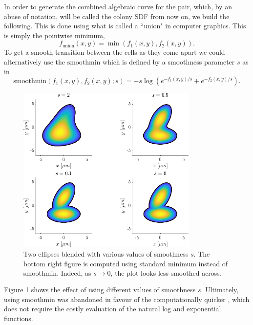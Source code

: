 In order to generate 
the combined algebraic curve for the pair, which, by an abuse of notation, will 
be called the colony SDF from now on, we build the following.
This is done using what is called a ``union" in computer graphics. 
This is simply the pointwise minimum,
\begin{equation*}
    f_{\textrm{union}}(x,y) = \min(f_1(x,y), f_2(x,y)).
\end{equation*} 
To get a smooth transition between the cells as they come apart we could alternatively use 
the $\textrm{smoothmin}$ which is defined by a smoothness parameter $s$ as in
\begin{equation*}
    \textrm{smoothmin}(f_1(x,y), f_2(x,y); s) = -s \log(e^{-f_1(x,y)/s} + e^{-f_2(x,y)/s}).
\end{equation*}
\begin{figure}[!htb]
    \centering
    \includegraphics[width=0.8\textwidth]{chapter2/figures/compareSmoothness.pdf}
    \caption{Two ellipses blended with various values of smoothness $s$. The bottom right 
             figure is computed using standard minimum instead of smoothmin. Indeed,
             as $s \rightarrow 0$, the plot looks less smoothed across.}
    \label{fig:compareSmoothness}
\end{figure}
Figure \ref{fig:compareSmoothness} shows the effect of using different values of smoothness
$s$. Ultimately, using smoothmin was abandoned in favour of the computationally quicker ,
which does not require the costly evaluation of the natural log and exponential functions.
\\

